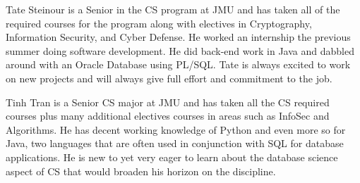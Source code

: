 \documentclass[11pt]{article}
\begin{document}
Tate Steinour is a Senior in the CS program at JMU and has taken all of the required courses for the program along with electives in Cryptography, Information Security, and Cyber Defense. He worked an internship the previous summer doing software development. He did back-end work in Java and dabbled around with an Oracle Database using PL/SQL. Tate is always excited to work on new projects and will always give full effort and commitment to the job.
	
Tinh Tran is a Senior CS major at JMU and has taken all the CS required courses plus many additional electives courses in areas such as InfoSec and Algorithms. He has decent working knowledge of Python and even more so for Java, two languages that are often used in conjunction with SQL for database applications. He is new to yet very eager to learn about the database science aspect of CS that would broaden his horizon on the discipline. 

\end{document}
